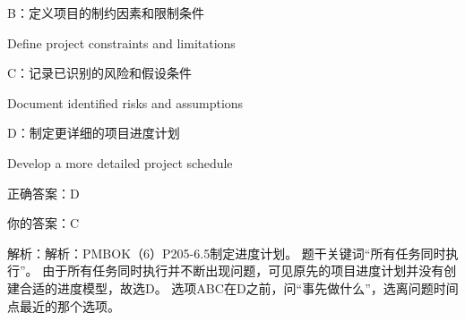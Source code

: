 B：定义项目的制约因素和限制条件

Define project constraints and limitations

C：记录已识别的风险和假设条件

Document identified risks and assumptions

D：制定更详细的项目进度计划

Develop a more detailed project schedule

正确答案：D

你的答案：C

解析：解析：PMBOK（6）P205-6.5制定进度计划。 题干关键词“所有任务同时执行”。 由于所有任务同时执行并不断出现问题，可见原先的项目进度计划并没有创建合适的进度模型，故选D。 选项ABC在D之前，问“事先做什么”，选离问题时间点最近的那个选项。


